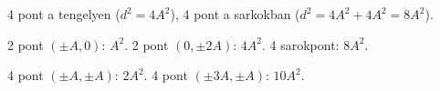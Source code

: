 \begin{center}\end{center}

4 pont a tengelyen ($d^2=4A^2$), 4 pont a sarkokban ($d^2=4A^2+4A^2=8A^2$).

\begin{center}\end{center}

2 pont $(\pm A,0)$: $A^2$. 2 pont $(0,\pm2A)$: $4A^2$. 4 sarokpont: $8A^2$.

\begin{center}\end{center}

4 pont $(\pm A,\pm A)$: $2A^2$. 4 pont $(\pm3A,\pm A)$: $10A^2$.

\begin{center}\end{center}

